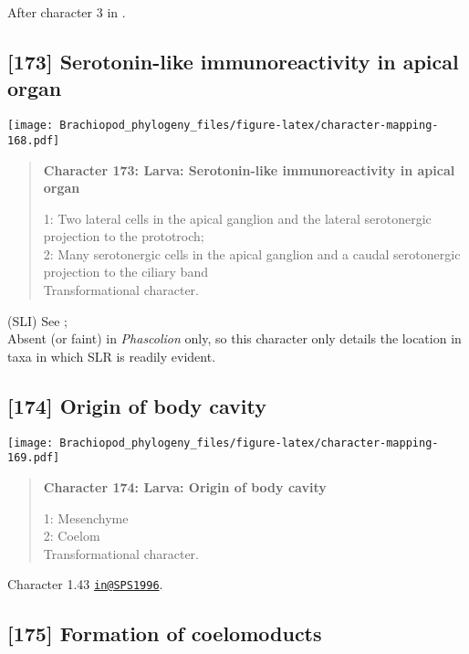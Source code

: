 \documentclass[openany]{book}
\theoremstyle{definition}
\theoremstyle{definition}
\theoremstyle{definition}
\theoremstyle{remark}
\begin{document}
After character 3 in \citet{Richter2010}.

\subsection*{{[}173{]} Serotonin-like immunoreactivity in apical
organ}\label{serotonin-like-immunoreactivity-in-apical-organ}

\texttt{[image: Brachiopod\_phylogeny\_files/figure-latex/character-mapping-168.pdf]}

\begin{quote}
\textbf{Character 173: Larva: Serotonin-like immunoreactivity in apical
organ}

1: Two lateral cells in the apical ganglion and the lateral serotonergic
projection to the prototroch;\\
2: Many serotonergic cells in the apical ganglion and a caudal
serotonergic projection to the ciliary band\\
Transformational character.
\end{quote}

(SLI) See \citet{Haszprunar2000}; \citet{Richter2010}\\
Absent (or faint) in \emph{Phascolion} only, so this character only
details the location in taxa in which SLR is readily evident.

\subsection*{{[}174{]} Origin of body
cavity}\label{origin-of-body-cavity}

\texttt{[image: Brachiopod\_phylogeny\_files/figure-latex/character-mapping-169.pdf]}

\begin{quote}
\textbf{Character 174: Larva: Origin of body cavity}

1: Mesenchyme\\
2: Coelom\\
Transformational character.
\end{quote}

Character 1.43 \href{mailto:in@SPS1996}{\nolinkurl{in@SPS1996}}.

\subsection*{{[}175{]} Formation of
coelomoducts}\label{formation-of-coelomoducts}
\end{document}
